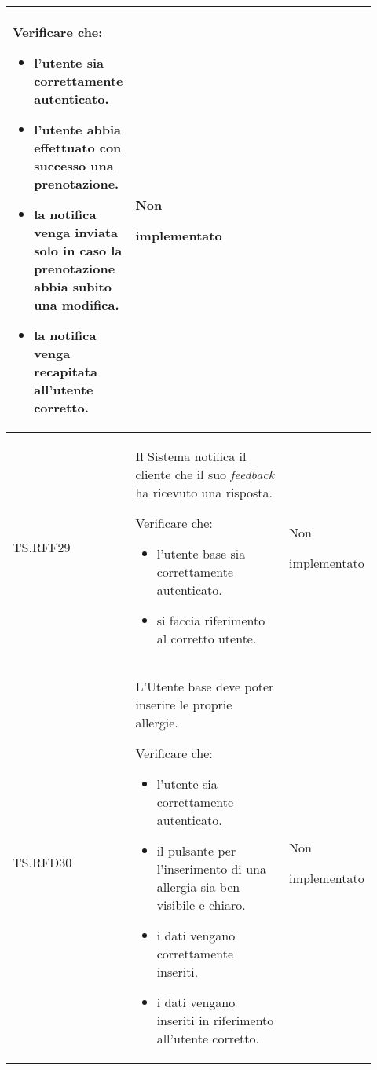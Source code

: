 \begin{longtable}{|p{0.10\linewidth}|p{0.70\linewidth}|p{0.12\linewidth}|}
	Verificare che:
	\begin{itemize}
		\item l'utente sia correttamente autenticato.
		\item l'utente abbia effettuato con successo una prenotazione.
		\item la notifica venga inviata solo in caso la prenotazione abbia subito una modifica.
		\item la notifica venga recapitata all'utente corretto.
	\end{itemize}                                         &
	Non \par implementato                                                                                                                                                   \\
	\hline
	TS.RFF29                                                                                                                        &
	Il Sistema notifica il cliente che il suo \textit{feedback} ha ricevuto una risposta. \par
	Verificare che:
	\begin{itemize}
		\item l'utente base sia correttamente autenticato.
		\item si faccia riferimento al corretto utente.
	\end{itemize}                                                                              &
	Non \par implementato                                                                                                                                                   \\
	\hline
	TS.RFD30                                                                                                                        &
	L'Utente base deve poter inserire le proprie allergie. \par
	Verificare che:
	\begin{itemize}
		\item l'utente sia correttamente autenticato.
		\item il pulsante per l'inserimento di una allergia sia ben visibile e chiaro.
		\item i dati vengano correttamente inseriti.
		\item i dati vengano inseriti in riferimento all'utente corretto.
	\end{itemize}                                                  &
	Non \par implementato                                                                                                                                                   \\

\end{longtable}
